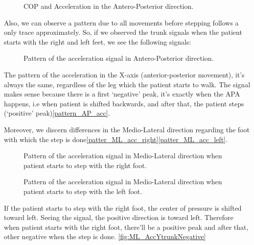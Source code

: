 \begin{figure}[H]
	\centering
	\caption{COP and Acceleration in the Antero-Posterior direction.}
	\label{fig:AP_AccXtrunk}
\end{figure}

Also, we can observe a pattern due to all movements before stepping follows a only trace approximately. So, if we observed the trunk signals when the patient starts with the right and left feet, we see the following signals:

\begin{figure}[H]
	\centering
	\caption{Pattern of the acceleration signal in Antero-Posterior direction.}
	\label{fig:pattern_AP_acc}
\end{figure}

The pattern of the acceleration in the X-axis (anterior-posterior movement), it’s always the same, regardless of the leg which the patient starts to walk. The signal makes sense because there is a first ‘negative’ peak, it’s exactly when the APA happens, i.e when patient is shifted backwards, and after that, the patient steps (‘positive’ peak)\ref{pattern_AP_acc}.

Moreover, we discern differences in the Medio-Lateral direction regarding the foot with which the step is done\ref{patter_ML_acc_right}\ref{patter_ML_acc_left}. 

\begin{figure}[H]
	\centering
	\caption{Pattern of the acceleration signal in Medio-Lateral direction when patient starts to step with the right foot.}
	\label{fig:pattern_ML_acc_right}
\end{figure}

\begin{figure}[H]
	\centering
	\caption{Pattern of the acceleration signal in Medio-Lateral direction when patient starts to step with the left foot.}
	\label{fig:pattern_ML_acc_left}
\end{figure}

If the patient starts to step with the right foot, the center of pressure is shifted toward left. Seeing the signal, the positive direction is toward left. Therefore when patient starts with the right foot, there’ll be a positive peak and after that, other negative when the step is done. \ref{fig:ML_AccYtrunkNegative}


